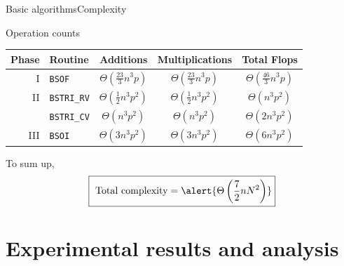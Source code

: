 \documentclass[xcolor=table,final]{beamer} %
\begin{document}
\begin{frame}{Basic algorithms}{Complexity}  
  \begin{block}{Operation counts}
    \begin{center}
      \begin{tabular}{r|l|c|c|c}
        \toprule
        Phase & Routine & Additions & Multiplications & Total Flops  \\
        \hline
        I&{\tt BSOF} & 
        $\displaystyle\Theta\left(\frac{23}{3} n^{3} p\right)$
        & $\displaystyle\Theta\left(\frac{23}{3} n^{3} p\right)$
        & $\displaystyle\Theta\left(\frac{46}{3} n^{3} p\right)$\\
        II&{\tt BSTRI\_RV} & 
        $\displaystyle\Theta\left(\frac{1}{2} n^3 p^{2}\right)$
        & $\displaystyle\Theta\left(\frac{1}{2} n^3 p^{2}\right)$
        & $\displaystyle\Theta\left(n^3 p^{2}\right)$\\
        \cline{2-5}
        &{\tt BSTRI\_CV} & 
        $\displaystyle\Theta\left(n^3 p^{2}\right)$
        & $\displaystyle\Theta \left(n^3 p^{2}\right)$
        & $\displaystyle\Theta \left(2 n^3 p^{2}\right)$\\
        III&{\tt BSOI} & 
        $\displaystyle\Theta \left(3 n^3 p^2\right)$
        & $\displaystyle\Theta \left(3 n^3 p^2\right)$
        & $\displaystyle\Theta \left(6 n^3 p^2\right)$\\
        \bottomrule  
      \end{tabular}
    \end{center}
    \pause
    To sum up, 
    \[
    \fbox{
      $\text{Total complexity} = \alert{\displaystyle\Theta\left(\frac{7}{2} n  N^2\right)}$}
    \]
  \end{block}
\end{frame}


\section{Experimental results and analysis}
\end{document}
